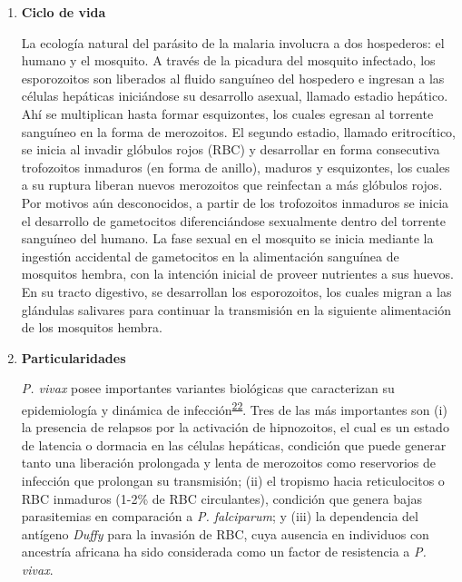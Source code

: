 \documentclass[]{article}
\begin{document}
\begin{enumerate}
  \begin{enumerate}
  \def\labelenumii{\roman{enumii}.}
  \item
    \textbf{Ciclo de vida}

    La ecología natural del parásito de la malaria involucra a dos
    hospederos: el humano y el mosquito. A través de la picadura del
    mosquito infectado, los esporozoitos son liberados al fluido
    sanguíneo del hospedero e ingresan a las células hepáticas
    iniciándose su desarrollo asexual, llamado estadio hepático. Ahí se
    multiplican hasta formar esquizontes, los cuales egresan al torrente
    sanguíneo en la forma de merozoitos. El segundo estadio, llamado
    eritrocítico, se inicia al invadir glóbulos rojos (RBC) y
    desarrollar en forma consecutiva trofozoitos inmaduros (en forma de
    anillo), maduros y esquizontes, los cuales a su ruptura liberan
    nuevos merozoitos que reinfectan a más glóbulos rojos. Por motivos
    aún desconocidos, a partir de los trofozoitos inmaduros se inicia el
    desarrollo de gametocitos diferenciándose sexualmente dentro del
    torrente sanguíneo del humano. La fase sexual en el mosquito se
    inicia mediante la ingestión accidental de gametocitos en la
    alimentación sanguínea de mosquitos hembra, con la intención inicial
    de proveer nutrientes a sus huevos. En su tracto digestivo, se
    desarrollan los esporozoitos, los cuales migran a las glándulas
    salivares para continuar la transmisión en la siguiente alimentación
    de los mosquitos hembra.
  \item
    \textbf{Particularidades}

    \emph{P. vivax} posee importantes variantes biológicas que
    caracterizan su epidemiología y dinámica de
    infección\textsuperscript{\protect\hyperlink{ref-howes2016global}{22}}.
    Tres de las más importantes son (i) la presencia de relapsos por la
    activación de hipnozoitos, el cual es un estado de latencia o
    dormacia en las células hepáticas, condición que puede generar tanto
    una liberación prolongada y lenta de merozoitos como reservorios de
    infección que prolongan su transmisión; (ii) el tropismo hacia
    reticulocitos o RBC inmaduros (1-2\% de RBC circulantes), condición
    que genera bajas parasitemias en comparación a \emph{P. falciparum};
    y (iii) la dependencia del antígeno \emph{Duffy} para la invasión de
    RBC, cuya ausencia en individuos con ancestría africana ha sido
    considerada como un factor de resistencia a \emph{P. vivax}. 
  \end{enumerate}
\end{enumerate}
\end{document}
